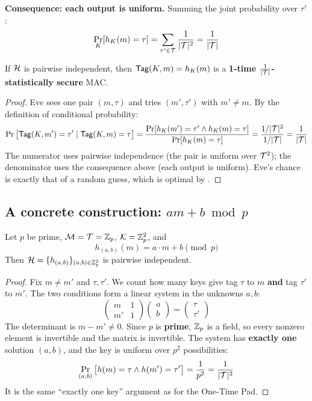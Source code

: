 \textbf{Consequence: each output is uniform.} Summing the joint probability over $\tau'$:
\[
  \Pr_K[h_K(m) = \tau] = \sum_{\tau' \in \mathcal{T}} \frac{1}{|\mathcal{T}|^2} = \frac{1}{|\mathcal{T}|}
\]

\begin{framedthm}[label={thm:pairwise-mac}]{}
  If $\mathcal{H}$ is pairwise independent, then $\mathsf{Tag}(K, m) = h_K(m)$ is a \textbf{1-time $\frac{1}{|\mathcal{T}|}$-statistically secure} MAC.
\end{framedthm}

\begin{proof}
  Eve sees one pair $(m, \tau)$ and tries $(m', \tau')$ with $m' \neq m$. By the definition of conditional probability:
  \[
    \Pr\big[\mathsf{Tag}(K, m') = \tau' \mid \mathsf{Tag}(K, m) = \tau\big]
    = \frac{\Pr[h_K(m') = \tau' \wedge h_K(m) = \tau]}{\Pr[h_K(m) = \tau]}
    = \frac{1/|\mathcal{T}|^2}{1/|\mathcal{T}|} = \frac{1}{|\mathcal{T}|}
  \]
  The numerator uses pairwise independence (the pair is uniform over $\mathcal{T}^2$); the denominator uses the consequence above (each output is uniform). Eve's chance is exactly that of a random guess, which is optimal by .
\end{proof}

\subsection{A concrete construction: $am + b \bmod p$}

\begin{framedprop}[label={prop:affine}]{}
  Let $p$ be prime, $\mathcal{M} = \mathcal{T} = \mathbb{Z}_p$, $\mathcal{K} = \mathbb{Z}_p^2$, and
  \[
    h_{(a,b)}(m) = a \cdot m + b \pmod p
  \]
  Then $\mathcal{H} = \{h_{(a,b)}\}_{(a,b) \in \mathbb{Z}_p^2}$ is pairwise independent.
\end{framedprop}

\begin{proof}
  Fix $m \neq m'$ and $\tau, \tau'$. We count how many keys give tag $\tau$ to $m$ \textbf{and} tag $\tau'$ to $m'$. The two conditions form a linear system in the unknowns $a, b$:
  \[
    \begin{pmatrix} m & 1 \\ m' & 1 \end{pmatrix} \begin{pmatrix} a \\ b \end{pmatrix} = \begin{pmatrix} \tau \\ \tau' \end{pmatrix}
  \]
  The determinant is $m - m' \neq 0$. Since $p$ is \textbf{prime}, $\mathbb{Z}_p$ is a field, so every nonzero element is invertible and the matrix is invertible. The system has \textbf{exactly one} solution $(a, b)$, and the key is uniform over $p^2$ possibilities:
  \[
    \Pr_{(a,b)}\big[h(m) = \tau \wedge h(m') = \tau'\big] = \frac{1}{p^2} = \frac{1}{|\mathcal{T}|^2}
  \]
  It is the same ``exactly one key'' argument as for the One-Time Pad.
\end{proof}

